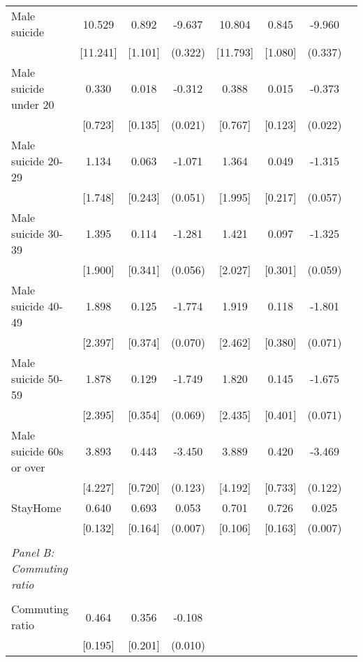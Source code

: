 \begin{tabular}{l*{7}{c}}
Male suicide        &      10.529&       0.892&      -9.637&      10.804&       0.845&      -9.960\\
                    &    [11.241]&     [1.101]&     (0.322)&    [11.793]&     [1.080]&     (0.337)\\
Male suicide under 20&       0.330&       0.018&      -0.312&       0.388&       0.015&      -0.373\\
                    &     [0.723]&     [0.135]&     (0.021)&     [0.767]&     [0.123]&     (0.022)\\
Male suicide 20-29  &       1.134&       0.063&      -1.071&       1.364&       0.049&      -1.315\\
                    &     [1.748]&     [0.243]&     (0.051)&     [1.995]&     [0.217]&     (0.057)\\
Male suicide 30-39  &       1.395&       0.114&      -1.281&       1.421&       0.097&      -1.325\\
                    &     [1.900]&     [0.341]&     (0.056)&     [2.027]&     [0.301]&     (0.059)\\
Male suicide 40-49  &       1.898&       0.125&      -1.774&       1.919&       0.118&      -1.801\\
                    &     [2.397]&     [0.374]&     (0.070)&     [2.462]&     [0.380]&     (0.071)\\
Male suicide 50-59  &       1.878&       0.129&      -1.749&       1.820&       0.145&      -1.675\\
                    &     [2.395]&     [0.354]&     (0.069)&     [2.435]&     [0.401]&     (0.071)\\
Male suicide 60s or over&       3.893&       0.443&      -3.450&       3.889&       0.420&      -3.469\\
                    &     [4.227]&     [0.720]&     (0.123)&     [4.192]&     [0.733]&     (0.122)\\
StayHome            &       0.640&       0.693&       0.053&       0.701&       0.726&       0.025\\
                    &     [0.132]&     [0.164]&     (0.007)&     [0.106]&     [0.163]&     (0.007)\\
\\ \multicolumn{1}{l}{\textit{Panel B: Commuting ratio}} \\\\[-1ex]
Commuting ratio     &       0.464&       0.356&      -0.108\\
                    &     [0.195]&     [0.201]&     (0.010)\\

\end{tabular}
